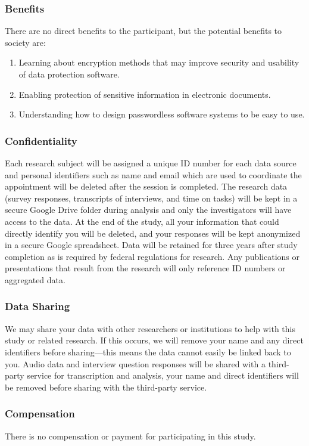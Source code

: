 \subsubsection*{Benefits}
There are no direct benefits to the participant, but the potential benefits to society are:
\begin{enumerate}
    \item Learning about encryption methods that may improve security and usability of data protection software.
    \item Enabling protection of sensitive information in electronic documents.
    \item Understanding how to design passwordless software systems to be easy to use.
\end{enumerate}

\subsubsection*{Confidentiality}
Each research subject will be assigned a unique ID number for each data source and personal identifiers such as name and email which are used to coordinate the appointment will be deleted after the session is completed. The research data (survey responses, transcripts of interviews, and time on tasks) will be kept in a secure Google Drive folder during analysis and only the investigators will have access to the data. At the end of the study, all your information that could directly identify you will be deleted, and your responses will be kept anonymized in a secure Google spreadsheet. Data will be retained for three years after study completion as is required by federal regulations for research. Any publications or presentations that result from the research will only reference ID numbers or aggregated data.

\subsubsection*{Data Sharing}
We may share your data with other researchers or institutions to help with this study or related research. If this occurs, we will remove your name and any direct identifiers before sharing---this means the data cannot easily be linked back to you. Audio data and interview question responses will be shared with a third-party service for transcription and analysis, your name and direct identifiers will be removed before sharing with the third-party service.

\subsubsection*{Compensation}
There is no compensation or payment for participating in this study.

